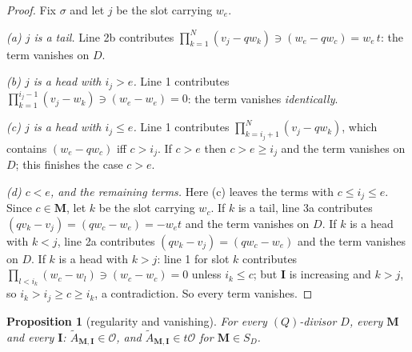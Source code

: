 \documentclass[11pt]{article}
\newtheorem{prop}[thm]{Proposition}
\theoremstyle{definition}
\newcommand{\At}{\widetilde{A}}
\newcommand{\bM}{\mathbf{M}}
\newcommand{\bI}{\mathbf{I}}
\begin{document}
\begin{proof}
Fix $\sigma$ and let $j$ be the slot carrying $w_e$.

\emph{(a) $j$ is a tail.}  Line 2b contributes $\prod_{k=1}^{N}(v_j-qw_k)\ni
(w_e-qw_c)=w_e\,t$: the term vanishes on $D$.

\emph{(b) $j$ is a head with $i_j>e$.}  Line 1 contributes
$\prod_{k=1}^{i_j-1}(v_j-w_k)\ni(w_e-w_e)=0$: the term vanishes
\emph{identically}.

\emph{(c) $j$ is a head with $i_j\le e$.}  Line 1 contributes
$\prod_{k=i_j+1}^{N}(v_j-qw_k)$, which contains $(w_e-qw_c)$ iff $c>i_j$.  If
$c>e$ then $c>e\ge i_j$ and the term vanishes on $D$; this finishes the case
$c>e$.

\emph{(d) $c<e$, and the remaining terms.}  Here (c) leaves the terms with
$c\le i_j\le e$.  Since $c\in\bM$, let $k$ be the slot carrying $w_c$.  If $k$ is
a tail, line 3a contributes $(qv_k-v_j)=(qw_c-w_e)=-w_e t$ and the term vanishes
on $D$.  If $k$ is a head with $k<j$, line 2a contributes
$(qv_k-v_j)=(qw_c-w_e)$ and the term vanishes on $D$.  If $k$ is a head with
$k>j$: line 1 for slot $k$ contributes $\prod_{l<i_k}(w_c-w_l)\ni(w_c-w_c)=0$
unless $i_k\le c$; but $\bI$ is increasing and $k>j$, so $i_k>i_j\ge c\ge i_k$,
a contradiction.  So every term vanishes.
\end{proof}

\begin{prop}[regularity and vanishing]\label{prop:qreg}
For every $(Q)$-divisor $D$, every $\bM$ and every $\bI$:
$\At_{\bM,\bI}\in\mathcal{O}$, and $\At_{\bM,\bI}\in t\mathcal{O}$ for
$\bM\in S_D$.
\end{prop}
\end{document}
